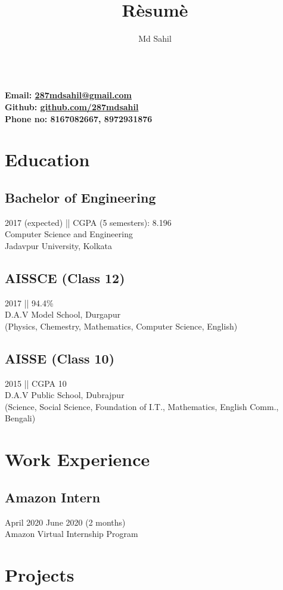 \documentclass{article}
\title{R\`esum\`e}
\author{Md Sahil} \date{}
\makeatletter
\renewcommand{\maketitle}{
\begin{center}
{\Huge\bfseries\theauthor}\\
\vspace{0.5em}
{\large\bfseries Email: \href{287mdsahil@gmail.com}{287mdsahil@gmail.com}}\\
\vspace{0.5em}
{\large\bfseries Github: \href{https://github.com/287mdsahil}{github.com/287mdsahil}}\\
\vspace{0.5em}
{\large\bfseries Phone no: 8167082667, 8972931876}\\
\end{center}
}
\makeatother
\begin{document}
{\maketitle} 

\section{Education} 

\subsection{Bachelor of Engineering}
2017 (expected) || CGPA (5 semesters): 8.196\\
Computer Science and Engineering\\
Jadavpur University, Kolkata\\

\subsection{AISSCE (Class 12)}
2017 || 94.4\%\\
D.A.V Model School, Durgapur\\
(Physics, Chemestry, Mathematics, Computer Science, English)\\

\subsection{AISSE (Class 10)}
2015 || CGPA 10\\
D.A.V Public School, Dubrajpur\\
(Science, Social Science, Foundation of I.T., Mathematics, English Comm., Bengali)\\


\section{Work Experience}
\subsection{Amazon Intern}
April 2020 \- June 2020 (2 months)\\
Amazon Virtual Internship Program


\section{Projects} 
\end{document}
